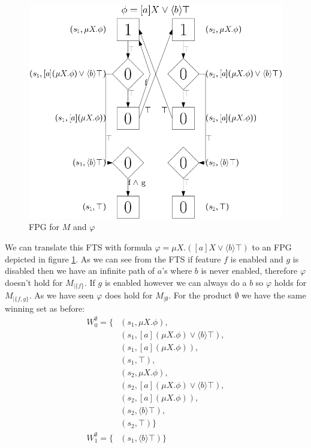 \begin{figure}[h]
	\centering
	\includegraphics[scale=0.3]{Examples/ExamleVerification/FPG}
	\caption[FPG for $M$ and $\varphi$]{FPG for $M$ and $\varphi$}
	\label{fig:exverfpg}
\end{figure}
We can translate this FTS with formula $\varphi = \mu X. ([a] X \vee \langle b \rangle \top)$ to an FPG depicted in figure \ref{fig:exverfpg}. As we can see from the FTS if feature $f$ is enabled and $g$ is disabled then we have an infinite path of $a$'s where $b$ is never enabled, therefore $\varphi$ doesn't hold for $M_{|\{f\}}$. If $g$ is enabled however we can always do a $b$ so $\varphi$ holds for $M_{|\{f,g\}}$. As we have seen $\varphi$ does hold for $M_{|\emptyset}$. For the product $\emptyset$ we have the same winning set as before:
\begin{align*}
W_0^\emptyset = \{& (s_1, \mu X.\phi),\\
& (s_1, [a](\mu X.\phi) \vee \langle b \rangle \top),\\
& (s_1, [a](\mu X.\phi)),\\
& (s_1, \top),\\
& (s_2, \mu X.\phi),\\
& (s_2, [a](\mu X.\phi) \vee \langle b \rangle \top),\\
& (s_2, [a](\mu X.\phi)),\\
& (s_2, \langle b \rangle \top),\\
& (s_2, \top)
\}\\
W_1^\emptyset = \{& (s_1, \langle b \rangle \top )\}
\end{align*}
